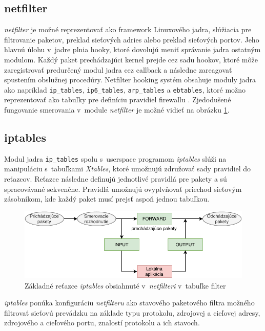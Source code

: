 \subsection{netfilter}
\emph{netfilter} je možné reprezentovať ako framework Linuxového jadra, slúžiacia pre filtrovanie paketov, preklad sieťových adries alebo preklad sieťových portov. Jeho hlavnú úlohu v~jadre plnia hooky, ktoré dovolujú meniť správanie jadra ostatným modulom. Každý paket prechádzajúci kernel prejde cez sadu hookov, ktoré môže zaregistrovať predurčený modul jadra cez callback a následne zareagovať spustením obslužnej procedúry. Netfilter hooking systém obsahuje moduly jadra ako napríklad \texttt{ip\_tables}, \texttt{ip6\_tables}, \texttt{arp\_tables} a \texttt{ebtables}, ktoré možno reprezentovať ako tabuľky pre definíciu pravidiel firewallu \cite{netfilter, manpages}. Zjedodušené fungovanie smerovania v~module \emph{netfilter} je možné vidieť na obrázku \ref{iptables}.

\subsection{iptables}
Modul jadra \texttt{ip\_tables} spolu s~userspace programom \emph{iptables} slúži na manipuláciu s~tabuľkami \emph{Xtables}, ktoré umožnujú združovať sady pravidiel do reťazcov. Reťazce následne definujú jednotlivé pravidlá pre pakety a sú spracovávané sekvenčne. Pravidlá umožnujú ovyplvňovať priechod sieťovým zásobníkom, kde každý paket musí prejsť aspoň jednou tabuľkou.
\cite{iptables_le, netfilter, manpages}
\begin{figure}[h]
	\centering
	\includegraphics[scale=1.07]{obrazky-figures/iptables.pdf}
	\caption{Základné reťazce \emph{iptables} obsiahnuté v~\emph{netfilteri} v~tabuľke filter}
	\label{iptables}
\end{figure}
                                                                                              
\emph{iptables} ponúka konfiguráciu \emph{netfilteru} ako stavového paketového filtra možného filtrovať sieťovú prevádzku na základe typu protokolu, zdrojovej a cieľovej adresy, zdrojového a cieľového portu, znalostí protokolu a ich stavoch. 

